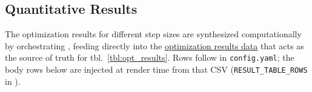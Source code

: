 \documentclass[
]{article}
\begin{document}
\subsection{Quantitative Results}\label{quantitative-results}

The optimization results for different step sizes are synthesized
computationally by orchestrating
\href{https://github.com/docxology/template/blob/main/infrastructure/reporting/executive_reporter.py}{},
feeding directly into the
\href{https://github.com/docxology/template/blob/main/projects/template_code_project/output/data/optimization_results.csv}{optimization
results data} that acts as the source of truth for
tbl.~\ref{tbl:opt_results}. Rows follow 
in \texttt{config.yaml}; the body rows below are injected at render time
from that CSV (\texttt{RESULT\_TABLE\_ROWS} in
).
\end{document}
